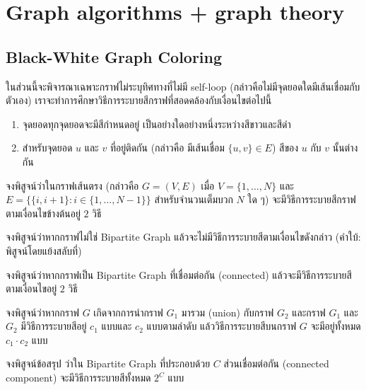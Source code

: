 \chapter{Graph algorithms + graph theory}

\section{Black-White Graph Coloring}

ในส่วนนี้จะพิจารณาเฉพาะกราฟไม่ระบุทิศทางที่ไม่มี self-loop (กล่าวคือไม่มีจุดยอดใดมีเส้นเชื่อมกับตัวเอง) เราจะทำการศึกษาวิธีการระบายสีกราฟที่สอดคล้องกับเงื่อนไขต่อไปนี้
\begin{enumerate}[nosep]
    \item จุดยอดทุกจุดยอดจะมีสีกำหนดอยู่ เป็นอย่างใดอย่างหนึ่งระหว่างสีขาวและสีดำ
    \item สำหรับจุดยอด $u$ และ $v$ ที่อยู่ติดกัน (กล่าวคือ มีเส้นเชื่อม $\{u, v\} \in E$) สีของ $u$ กับ $v$ นั้นต่างกัน
\end{enumerate}

\begin{exercise}
จงพิสูจน์ว่าในกราฟเส้นตรง (กล่าวคือ $G = (V, E)$ เมื่อ $V = \{1, \dots, N\}$ และ $E = \{\{i, i+1\} \colon i \in \{1, \dots, N-1\}\}$ สำหรับจำนวนเต็มบวก $N$ ใด ๆ) จะมีวิธีการระบายสีกราฟตามเงื่อนไขข้างต้นอยู่ $2$ วิธี
\end{exercise}

\begin{exercise}
จงพิสูจน์ว่าหากกราฟไม่ใช่ Bipartite Graph แล้วจะไม่มีวิธีการระบายสีตามเงื่อนไขดังกล่าว (คำใบ้: พิสูจน์โดยแย้งสลับที่)
\end{exercise}

\begin{exercise}
จงพิสูจน์ว่าหากกราฟเป็น Bipartite Graph ที่เชื่อมต่อกัน (connected) แล้วจะมีวิธีการระบายสีตามเงื่อนไขอยู่ $2$ วิธี
\end{exercise}

\begin{exercise}
จงพิสูจน์ว่าหากกราฟ $G$ เกิดจากการนำกราฟ $G_1$ มารวม (union) กับกราฟ $G_2$ และกราฟ $G_1$ และ $G_2$ มีวิธีการระบายสีอยู่ $c_1$ แบบและ $c_2$ แบบตามลำดับ แล้ววิธีการระบายสีบนกราฟ $G$ จะมีอยู่ทั้งหมด $c_1 \cdot c_2$ แบบ
\end{exercise}

\begin{exercise}
จงพิสูจน์ข้อสรุป ว่าใน Bipartite Graph ที่ประกอบด้วย $C$ ส่วนเชื่อมต่อกัน (connected component) จะมีวิธีการระบายสีทั้งหมด $2^C$ แบบ
\end{exercise}

